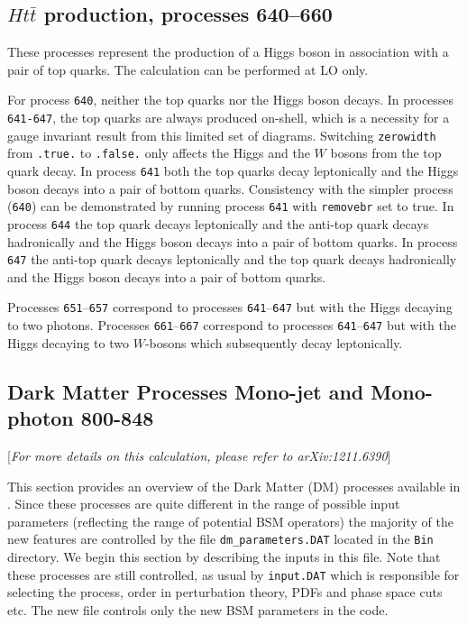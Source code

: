 \documentclass[12pt]{article}
\begin{document}
\subsection{$Ht{\bar t}$ production, processes 640--660}
\label{subsec:htt}

These processes represent the production of a Higgs boson in association
with a pair of top quarks. The calculation can be performed at LO only.

For process {\tt 640}, neither the top quarks nor the Higgs boson
decays. 
In processes {\tt 641-647}, the top quarks are always
produced on-shell, which is a necessity for a gauge invariant result
from this limited set of diagrams.
Switching {\tt zerowidth} from {\tt .true.} to {\tt .false.} only affects
the Higgs and the $W$ bosons from the top quark decay.
In process {\tt 641} both the top quarks decay leptonically
and the Higgs boson decays into a pair of bottom quarks. 
Consistency with
the simpler process ({\tt 640}) can be demonstrated by running process
{\tt 641} with {\tt removebr} set to true.
In process {\tt 644} the top quark decays leptonically
and the anti-top quark decays hadronically and the Higgs boson decays into a pair of bottom quarks. 
In process {\tt 647} the anti-top quark decays leptonically
and the top quark decays hadronically and the Higgs boson decays into a pair of bottom quarks. 

Processes {\tt 651}--{\tt 657} correspond to processes {\tt 641}--{\tt 647} but with the Higgs decaying
to two photons.
Processes {\tt 661}--{\tt 667} correspond to processes {\tt 641}--{\tt 647} but with the Higgs decaying
to two $W$-bosons which subsequently decay leptonically.

\subsection{Dark Matter Processes  Mono-jet and Mono-photon 800-848} 
[{\it For more details on this calculation, please refer to arXiv:1211.6390}]

This section provides an overview of the Dark Matter (DM) processes
available in \MCFM. Since these processes are quite different in the
range of possible input parameters (reflecting the range of potential
BSM operators) the majority of the new features are controlled by the
file {\tt dm\_parameters.DAT} located in the {\tt Bin} directory.  We
begin this section by describing the inputs in this file.  Note that
these processes are still controlled, as usual by {\tt input.DAT}
which is responsible for selecting the process, order in perturbation
theory, PDFs and phase space cuts etc. The new file controls only the
new BSM parameters in the code.
\end{document}
